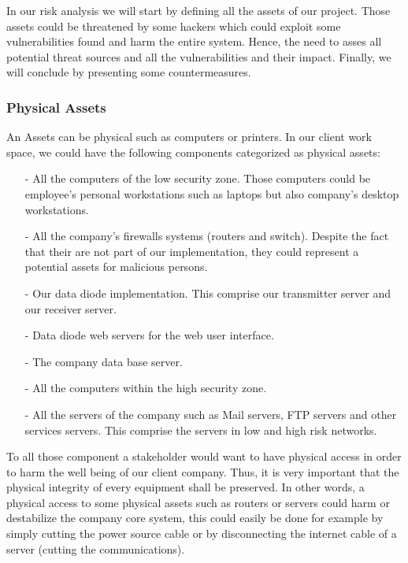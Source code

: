 \documentclass[a4paper,10pt]{article}
\begin{document}
In our risk analysis we will start by defining all the assets of our project. Those assets could be threatened by some hackers which could exploit some vulnerabilities found and harm the entire system. Hence, the need to asses all potential threat sources and all the vulnerabilities and their impact. Finally, we will conclude by presenting some countermeasures.

\subsubsection{Physical Assets}
An Assets can be physical such as computers or printers. In our client work space, we could have the following components categorized as physical assets:
\begin{enumerate}
\item[-] All the computers of the low security zone. Those computers could be employee's personal workstations such as laptops but also company's desktop workstations.
\item[-] All the company's firewalls systems (routers and switch). Despite the fact that their are not part of our implementation, they could represent a potential assets for malicious persons.
\item[-] Our data diode implementation. This comprise our transmitter server and our receiver server.
\item[-] Data diode web servers for the web user interface.
\item[-] The company data base server.
\item[-] All the computers within the high security zone.
\item[-] All the servers of the company such as Mail servers, FTP servers and other services servers. This comprise the servers in low and high risk networks.

\end{enumerate}
To all those component a stakeholder would want to have physical access in order to harm the well being of our client company. Thus, it is very important that the physical integrity of every equipment shall be preserved. In other words, a physical access to some physical assets such as routers or servers could harm or destabilize the company core system, this could easily be done for example by simply cutting the power source cable or by disconnecting the internet cable of a server (cutting the communications).
\end{document}
